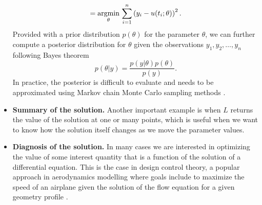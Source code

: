 \begin{itemize}
\begin{equation}
        = 
        \underset{\theta}{\text{argmin}} \, \sum_{i=1}^n \left( y_i - u(t_i; \theta) \right)^2 .
    \end{equation}
    Provided with a prior distribution $p(\theta)$ for the parameter $\theta$, we can further compute a posterior distribution for $\theta$ given the observations $y_1, y_2, \ldots, y_n$ following Bayes theorem 
    \begin{equation}
        p(\theta | y) = \frac{p(y | \theta) p (\theta)}{p(y)}. 
    \end{equation}
    In practice, the posterior is difficult to evaluate and needs to be approximated using Markov chain Monte Carlo sampling methods \cite{gelman2013bayesian}.
    \item \textbf{Summary of the solution.} Another important example is when $L$ returns the value of the solution at one or many points, which is useful when we want to know how the solution itself changes as we move the parameter values. 
    \item \textbf{Diagnosis of the solution.} In many cases we are interested in optimizing the value of some interest quantity that is a function of the solution of a differential equation. This is the case in design control theory, a popular approach in aerodynamics modelling where goals include to maximize the speed of an airplane given the solution of the flow equation for a given geometry profile \cite{Jameson_1988}. 
\end{itemize}

